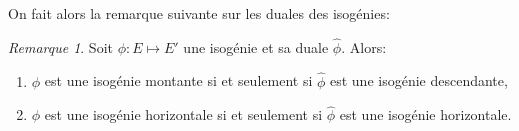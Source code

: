 \documentclass[10pt,a4paper]{book}
\theoremstyle{plain}
\theoremstyle{definition}
\theoremstyle{definition}
\theoremstyle{definition}
\theoremstyle{definition}
\theoremstyle{definition}
\theoremstyle{remark}
\newtheorem{rem}[thm]{Remarque}
\theoremstyle{remark}
\theoremstyle{definition}
\begin{document}
On fait alors la remarque suivante sur les duales des isogénies:
\begin{rem}
\label{rem:dua:vol}
Soit $\phi : E \mapsto E'$ une isogénie et sa duale $\widehat{\phi}$. Alors:
\begin{enumerate}
\item $\phi$ est une isogénie montante si et seulement si $\widehat{\phi}$ est une isogénie descendante,
\item $\phi$ est une isogénie horizontale si et seulement si $\widehat{\phi}$ est une isogénie horizontale.
\end{enumerate}
\end{rem}

\end{document}

